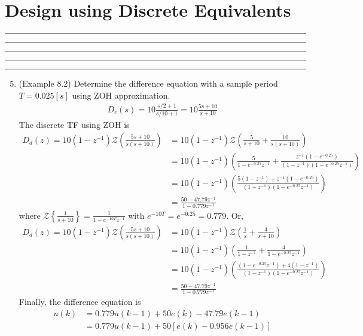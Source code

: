 \setcounter{chapter}{7}
\setcounter{section}{2}
\section{Design using Discrete Equivalents}
\vspace{-8pt} \hrule \hrule \hrule \hrule \hrule  \vspace{12pt}
\begin{enumerate}
	\setcounter{enumi}{4}
	\item (Example 8.2) Determine the difference equation with a sample period $T=0.025[s]$ using ZOH approximation. 
		\begin{align*}
			D_c(s) = 10 \frac{s/2+1}{s/10+1} = 10 \frac{5s+10}{s+10}
		\end{align*}
		The discrete TF using ZOH  is 
		\begin{align*}
			D_d(z) = 10 (1-z^{-1}) \mathcal{Z} \left( \frac{5s+10}{s(s+10)} \right)
			&= 10 (1-z^{-1}) \mathcal{Z} \left(  \frac{5}{s+10} + \frac{10}{s(s+10)} \right) \\
			&= 10 (1-z^{-1})  \left( \frac{5}{1-e^{-0.25}z^{-1}} + \frac{z^{-1}(1-e^{-0.25})}{(1-z^{-1})(1-e^{-0.25}z^{-1})} \right) \\
			&=  10 (1-z^{-1})  \left(  \frac{5(1-z^{-1}) + z^{-1}(1-e^{-0.25})}{(1-z^{-1})(1-e^{-0.25}z^{-1})} \right) \\
			&=   \frac{50 - 47.79z^{-1}}{1 - 0.779z^{-1}} 
		\end{align*}
	where $\mathcal{Z} \left\{ \frac{1}{s+10} \right\} = \frac{1}{1-e^{-10T}z^{-1}}$ with  $e^{-10T} = e^{-0.25}=0.779$. Or, 
		\begin{align*}
			D_d(z) = 10 (1-z^{-1}) \mathcal{Z} \left( \frac{5s+10}{s(s+10)} \right)
			&= 10 (1-z^{-1}) \mathcal{Z} \left(  \frac{1}{s} + \frac{4}{s+10} \right) \\
			&= 10 (1-z^{-1})  \left( \frac{1}{1-z^{-1}} + \frac{4}{1-e^{-0.25}z^{-1}} \right) \\
			&=  10 (1-z^{-1})  \left(  \frac{(1-e^{-0.25}z^{-1})+ 4(1-z^{-1})}{(1-z^{-1})(1-e^{-0.25}z^{-1})} \right) \\
			&=   \frac{50 - 47.79z^{-1}}{1 - 0.779z^{-1}} 
		\end{align*}
		Finally, the difference equation is 
		\begin{align*}
			u(k) &= 0.779 u(k-1) + 50 e(k) - 47.79 e(k-1) \\
			&= 0.779 u(k-1) + 50 [ e(k) -  0.956 e(k-1) ]
		\end{align*}

	\end{enumerate}
